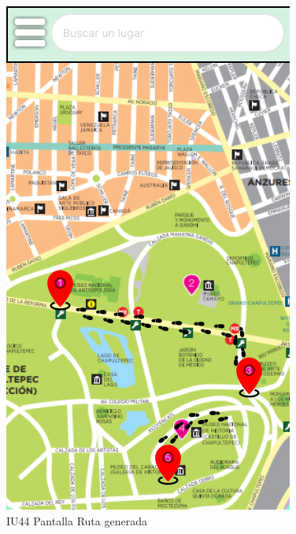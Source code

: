 \begin{figure}[h]
    \begin{minipage}{0.5\textwidth}
        \centering
        \includegraphics[width=.7\linewidth]{Pantallas Prototipo3/IU44-Ruta generada.jpg}
        \caption{IU44 Pantalla Ruta generada}
    \end{minipage}%
\end{figure}